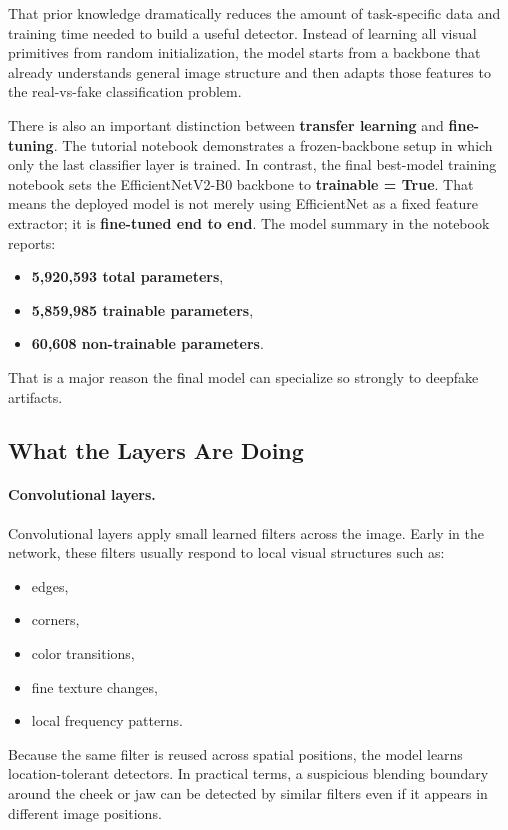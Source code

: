 \documentclass[11pt]{article}
\begin{document}
That prior knowledge dramatically reduces the amount of task-specific data and training time needed to build a useful detector. Instead of learning all visual primitives from random initialization, the model starts from a backbone that already understands general image structure and then adapts those features to the real-vs-fake classification problem.

There is also an important distinction between \textbf{transfer learning} and \textbf{fine-tuning}. The tutorial notebook demonstrates a frozen-backbone setup in which only the last classifier layer is trained. In contrast, the final best-model training notebook sets the EfficientNetV2-B0 backbone to \textbf{trainable = True}. That means the deployed model is not merely using EfficientNet as a fixed feature extractor; it is \textbf{fine-tuned end to end}. The model summary in the notebook reports:
\begin{itemize}[leftmargin=1.5em]
    \item \textbf{5,920,593 total parameters},
    \item \textbf{5,859,985 trainable parameters},
    \item \textbf{60,608 non-trainable parameters}.
\end{itemize}

That is a major reason the final model can specialize so strongly to deepfake artifacts.

\subsection{What the Layers Are Doing}

\paragraph{Convolutional layers.}
Convolutional layers apply small learned filters across the image. Early in the network, these filters usually respond to local visual structures such as:
\begin{itemize}[leftmargin=1.5em]
    \item edges,
    \item corners,
    \item color transitions,
    \item fine texture changes,
    \item local frequency patterns.
\end{itemize}

Because the same filter is reused across spatial positions, the model learns location-tolerant detectors. In practical terms, a suspicious blending boundary around the cheek or jaw can be detected by similar filters even if it appears in different image positions.
\end{document}
